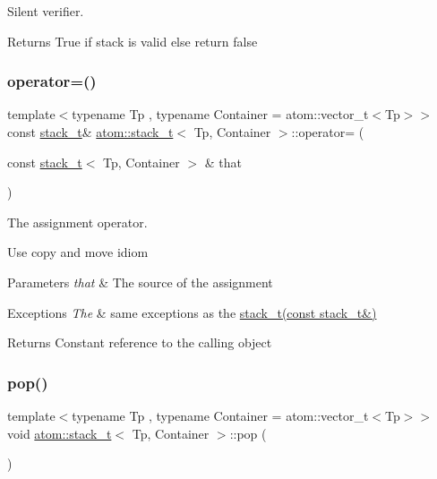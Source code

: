 Silent verifier. 

\begin{DoxyReturn}{Returns}
True if stack is valid else return false 
\end{DoxyReturn}
\mbox{\label{classatom_1_1stack__t_a9b0f89271398f910e88a88014f29669d}} 
\subsubsection{\texorpdfstring{operator=()}{operator=()}}
{\footnotesize\ttfamily template$<$typename Tp , typename Container  = atom\+::vector\+\_\+t$<$\+Tp$>$$>$ \\
const \hyperlink{classatom_1_1stack__t}{stack\+\_\+t}\& \hyperlink{classatom_1_1stack__t}{atom\+::stack\+\_\+t}$<$ Tp, Container $>$\+::operator= (\begin{DoxyParamCaption}\item[{const \hyperlink{classatom_1_1stack__t}{stack\+\_\+t}$<$ Tp, Container $>$ \&}]{that }\end{DoxyParamCaption})\hspace{0.3cm}{\ttfamily [inline]}}



The assignment operator. 

Use copy and move idiom 
\begin{DoxyParams}{Parameters}
{\em that} & The source of the assignment \\
\hline
\end{DoxyParams}

\begin{DoxyExceptions}{Exceptions}
{\em The} & same exceptions as the \hyperlink{classatom_1_1stack__t_a519cc745d74f25e1e73168d63bd7ce4a}{stack\+\_\+t(const stack\+\_\+t\&)} \\
\hline
\end{DoxyExceptions}
\begin{DoxyReturn}{Returns}
Constant reference to the calling object 
\end{DoxyReturn}
\mbox{\label{classatom_1_1stack__t_a86b9e880776b1ee326d07dee157c4991}} 
\subsubsection{\texorpdfstring{pop()}{pop()}}
{\footnotesize\ttfamily template$<$typename Tp , typename Container  = atom\+::vector\+\_\+t$<$\+Tp$>$$>$ \\
void \hyperlink{classatom_1_1stack__t}{atom\+::stack\+\_\+t}$<$ Tp, Container $>$\+::pop (\begin{DoxyParamCaption}{ }\end{DoxyParamCaption})\hspace{0.3cm}{\ttfamily [inline]}}



